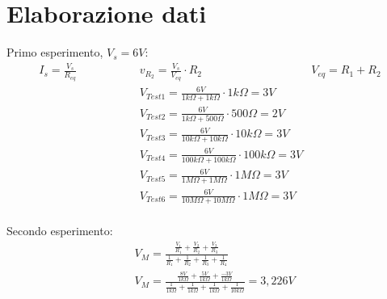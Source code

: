     \newpage

    \section{Elaborazione dati}
    Primo esperimento, $V_s = 6V$:
    \begin{align*}
        I_s = \frac{V_s}{R_{eq}}  \hspace{2cm}   & v_{R_2} = \frac{V_s}{V_{eq}} \cdot R_2  \hspace{2cm} &  V_{eq} = R_1 + R_2 \\
        & V_{Test1} = \frac{6V}{1k\Omega + 1k\Omega} \cdot 1k\Omega = 3V \\
        & V_{Test2} = \frac{6V}{1k\Omega + 500\Omega} \cdot 500\Omega = 2V \\
        & V_{Test3} = \frac{6V}{10k\Omega + 10k\Omega} \cdot 10k\Omega = 3V \\
        & V_{Test4} = \frac{6V}{100k\Omega + 100k\Omega} \cdot 100k\Omega = 3V \\
        & V_{Test5} = \frac{6V}{1M\Omega + 1M\Omega} \cdot 1M\Omega = 3V \\
        & V_{Test6} = \frac{6V}{10M\Omega + 10M\Omega} \cdot 1M\Omega = 3V \\
    \end{align*}

    Secondo esperimento:
    \begin{align*}
       & V_M = \frac{\frac{V_1}{R_1} + \frac{V_2}{R_2} + \frac{V_3}{R_3}}{\frac{1}{R_1} + \frac{1}{R_2} + \frac{1}{R_3} + \frac{1}{R_4}}\\
       & V_M = \frac{\frac{8V}{1k\Omega} + \frac{5V}{1k\Omega} + \frac{-3V}{1k\Omega}}{\frac{1}{1k\Omega} + \frac{1}{1k\Omega} + \frac{1}{1k\Omega} + \frac{1}{10k\Omega}} = 3,226V
    \end{align*}
    


